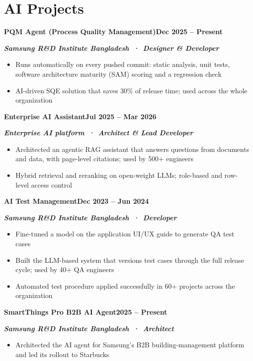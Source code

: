 \documentclass[10pt,letterpaper]{article}
\newcommand{\head}[2]{\Needspace{6\baselineskip}\textbf{#1}\hfill\textbf{#2}\par}
\newcommand{\sub}[2]{\textbf{\textit{#1}}\hfill\textbf{#2}\par}
\newcommand{\gap}{\vspace{3pt}}
\begin{document}
\section{AI Projects}
\head{PQM Agent (Process Quality Management)}{Dec 2025 -- Present}
\sub{Samsung R\&D Institute Bangladesh \,·\, Designer \& Developer}{}
\begin{itemize}
  \item Runs automatically on every pushed commit: static analysis, unit tests, software architecture maturity (SAM) scoring and a regression check
  \item AI-driven SQE solution that saves 30\% of release time; used across the whole organization
\end{itemize}
\gap
\head{Enterprise AI Assistant}{Jul 2025 -- Mar 2026}
\sub{Enterprise AI platform \,·\, Architect \& Lead Developer}{}
\begin{itemize}
  \item Architected an agentic RAG assistant that answers questions from documents and data, with page-level citations; used by 500+ engineers
  \item Hybrid retrieval and reranking on open-weight LLMs; role-based and row-level access control
\end{itemize}
\gap
\head{AI Test Management}{Dec 2023 -- Jun 2024}
\sub{Samsung R\&D Institute Bangladesh \,·\, Developer}{}
\begin{itemize}
  \item Fine-tuned a model on the application UI/UX guide to generate QA test cases
  \item Built the LLM-based system that versions test cases through the full release cycle; used by 40+ QA engineers
  \item Automated test procedure applied successfully in 60+ projects across the organization
\end{itemize}
\gap
\head{SmartThings Pro B2B AI Agent}{2025 -- Present}
\sub{Samsung R\&D Institute Bangladesh \,·\, Architect}{}
\begin{itemize}
  \item Architected the AI agent for Samsung's B2B building-management platform and led its rollout to Starbucks
\end{itemize}

\end{document}
